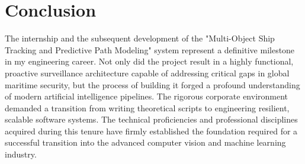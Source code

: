 \section{Conclusion}
The internship and the subsequent development of the "Multi-Object Ship Tracking and Predictive Path Modeling" system represent a definitive milestone in my engineering career. Not only did the project result in a highly functional, proactive surveillance architecture capable of addressing critical gaps in global maritime security, but the process of building it forged a profound understanding of modern artificial intelligence pipelines. The rigorous corporate environment demanded a transition from writing theoretical scripts to engineering resilient, scalable software systems. The technical proficiencies and professional disciplines acquired during this tenure have firmly established the foundation required for a successful transition into the advanced computer vision and machine learning industry.